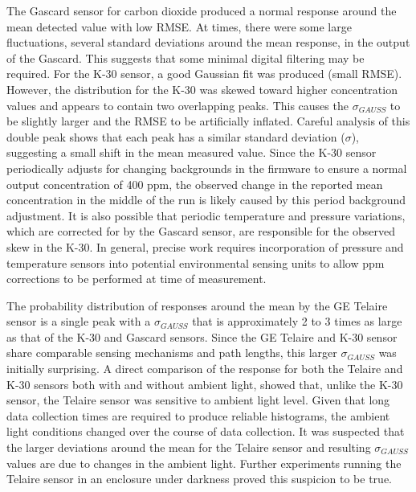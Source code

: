 \documentclass[times]{joehreview}
\begin{document}
	The Gascard sensor for carbon dioxide produced a normal response around the mean detected value with low RMSE.  At times, there were some large fluctuations, several standard deviations around the mean response, in the output of the Gascard.  This suggests that some minimal digital filtering may be required.  For the K-30 sensor, a good Gaussian fit was produced (small RMSE).  However, the distribution for the K-30 was skewed toward higher concentration values and appears to contain two overlapping peaks. This causes the $\sigma_{GAUSS}$ to be slightly larger and the RMSE to be artificially inflated.  Careful analysis of this double peak shows that each peak has a similar standard deviation ($\sigma$), suggesting a small shift in the mean measured value.  Since the K-30 sensor periodically adjusts for changing backgrounds in the firmware to ensure a normal output concentration of 400 ppm, the observed change in the reported mean concentration in the middle of the run is likely caused by this period background adjustment.  It is also possible that periodic temperature and pressure variations, which are corrected for by the Gascard sensor, are responsible for the observed skew in the K-30.  In general, precise work requires incorporation of pressure and temperature sensors into potential environmental sensing units to allow ppm corrections to be performed at time of measurement.
	
	The probability distribution of responses around the mean by the GE Telaire sensor is a single peak with a $\sigma_{GAUSS}$ that is approximately 2 to 3 times as large as that of the K-30 and Gascard sensors.  Since the GE Telaire and K-30 sensor share comparable sensing mechanisms and path lengths, this larger $\sigma_{GAUSS}$ was initially surprising.  A direct comparison of the response for both the Telaire and K-30 sensors both with and without ambient light, showed that, unlike the K-30 sensor, the Telaire sensor was sensitive to ambient light level.  Given that long data collection times are required to produce reliable histograms, the ambient light conditions changed over the course of data collection.  It was suspected that the larger deviations around the mean for the Telaire sensor and resulting $\sigma_{GAUSS}$ values are due to changes in the ambient light.  Further experiments running the Telaire sensor in an enclosure under darkness proved this suspicion to be true.
	
\end{document}
